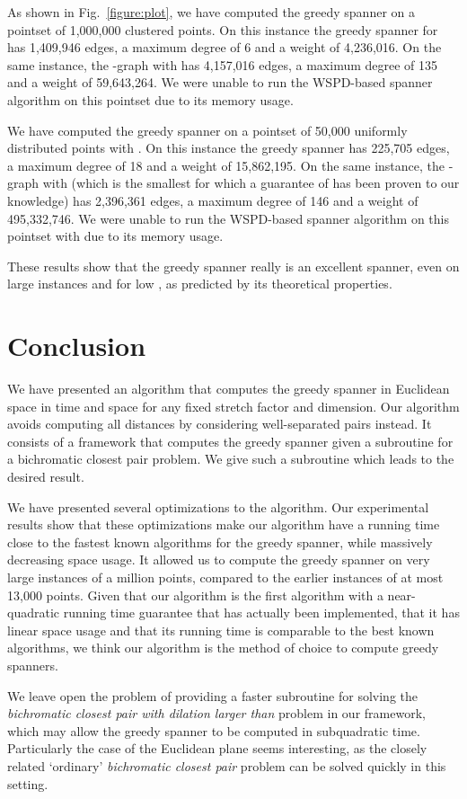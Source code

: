 \documentclass[runningheads,envcountsame,oribibl,orivec]{llncs}
\begin{document}
As shown in Fig.~\ref{figure:plot}, we have computed the greedy spanner on a pointset of 1,000,000 clustered points. On this instance the greedy spanner for  has 1,409,946 edges, a maximum degree of 6 and a weight of 4,236,016. On the same instance, the -graph with  has 4,157,016 edges, a maximum degree of 135 and a weight of 59,643,264. We were unable to run the WSPD-based spanner algorithm on this pointset due to its memory usage.

We have computed the greedy spanner on a pointset of 50,000 uniformly distributed points with . On this instance the greedy spanner has 225,705 edges, a maximum degree of 18 and a weight of 15,862,195. On the same instance, the -graph with  (which is the smallest  for which a guarantee of  has been proven to our knowledge) has 2,396,361 edges, a maximum degree of 146 and a weight of 495,332,746. We were unable to run the WSPD-based spanner algorithm on this pointset with  due to its memory usage.

These results show that the greedy spanner really is an excellent spanner, even on large instances and for low , as predicted by its theoretical properties.

\section{Conclusion}

We have presented an algorithm that computes the greedy spanner in Euclidean space in  time and  space for any fixed stretch factor and dimension. Our algorithm avoids computing all distances by considering well-separated pairs instead. It consists of a framework that computes the greedy spanner given a subroutine for a bichromatic closest pair problem. We give such a subroutine which leads to the desired result.

We have presented several optimizations to the algorithm. Our experimental results show that these optimizations make our algorithm have a running time close to the fastest known algorithms for the greedy spanner, while massively decreasing space usage. It allowed us to compute the greedy spanner on very large  instances of a million points, compared to the earlier instances of at most 13,000 points. Given that our algorithm is the first algorithm with a near-quadratic running time guarantee that has actually been implemented, that it has linear space usage and that its running time is comparable to the best known algorithms, we think our algorithm is the method of choice to compute greedy spanners.

We leave open the problem of providing a faster subroutine for solving the \emph{bichromatic closest pair with dilation larger than } problem in our framework, which may allow the greedy spanner to be computed in subquadratic time. Particularly the case of the Euclidean plane seems interesting, as the closely related `ordinary' \emph{bichromatic closest pair} problem can be solved quickly in this setting.



\end{document}
